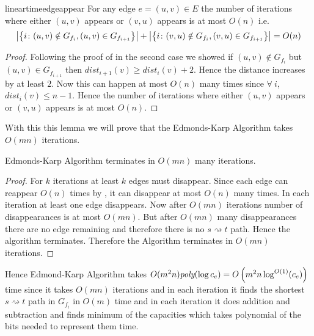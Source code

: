 \begin{lemma}{}{lineartimeedgeappear}
	For any edge $e=(u,v)\in E$ the number of iterations where either $(u,v)$ appears or $(v,u)$ appears is at most $O(n)$ i.e. $$\left|\left\{i\colon (u,v)\notin G_{f_i}, (u,v)\in G_{f_{i+1}}\right\}\right|+\left|\left\{i\colon (v,u)\notin G_{f_i}, (v,u)\in G_{f_{i+1}}\right\}\right|=O(n)$$
\end{lemma}
\begin{proof}
	Following the proof of   in the second case we showed if $(u,v)\notin G_{f_i}$ but $(u,v)\in G_{f_{i+1}}$ then $\textit{dist}_{i+1}(v)\geq \textit{dist}_i(v)+2$. Hence the distance increases by at least $2$. Now this can happen at most $O(n)$ many times since $\forall\ i$, $\textit{dist}_i(v)\leq n-1$. Hence the number of iterations where either $(u,v)$ appears or $(v,u)$ appears is at most $O(n)$.
\end{proof}

With this this lemma we will prove that the Edmonds-Karp Algorithm takes $O(mn)$ iterations.
\begin{Theorem}{}{}
	Edmonds-Karp Algorithm terminates in $O(mn)$ many iterations.
\end{Theorem}
\begin{proof}
	For $k$ iterations at least $k$ edges must disappear. Since each edge can reappear $O(n)$ times by , it can disappear at most $O(n)$ many times. In each iteration at least one edge disappears. Now after $O(mn)$ iterations number of disappearances is at most $O(mn)$. But after $O(mn)$ many disappearances  there are no edge remaining and therefore there is no $s\rightsquigarrow t$ path. Hence the algorithm terminates. Therefore the Algorithm terminates in $O(mn)$ iterations.
\end{proof}

Hence Edmond-Karp Algorithm takes $O(m^2n)\textit{poly}(\log c_e)=O\left(m^2n\log^{O(1)}(c_e)\right)$ time since it takes $O(mn)$ iterations and in each iteration it finds the shortest $s\rightsquigarrow t$ path in $G_{f_i}$ in $O(m)$ time and in each iteration it does addition and subtraction and finds minimum of the capacities which takes polynomial of the bits needed to represent them time.

